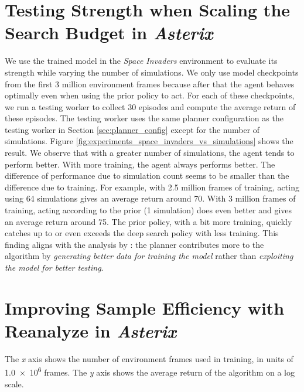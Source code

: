 \section{Testing Strength when Scaling the Search Budget in \textit{Asterix}}
We use the trained \moozi model in the \textit{Space Invaders} environment to evaluate its strength while varying the number of simulations.
We only use model checkpoints from the first 3 million environment frames because after that the agent behaves optimally even when using the prior policy to act.
For each of these checkpoints, we run a testing worker to collect 30 episodes and compute the average return of these episodes.
The testing worker uses the same planner configuration as the testing worker in Section \ref{sec:planner_config} except for the number of simulations.
Figure \ref{fig:experiments_space_invaders_vs_simulations} shows the result.
We observe that with a greater number of simulations, the agent tends to perform better.
With more training, the agent always performs better.
The difference of performance due to simulation count seems to be smaller than the difference due to training.
For example, with 2.5 million frames of training, acting using 64 simulations gives an average return around 70.
With 3 million frames of training, acting according to the prior (1 simulation) does even better and gives an average return around 75.
The prior policy, with a bit more training, quickly catches up to or even exceeds the deep search policy with less training.
This finding aligns with the analysis by \citeauthor{RolePlanningModelbased_Hamrick.Friesen.ea_2022} \cite{RolePlanningModelbased_Hamrick.Friesen.ea_2022}:
the planner contributes more to the algorithm by \textit{generating better data for training the model} rather than \textit{exploiting the model for better testing}.


\section{Improving Sample Efficiency with Reanalyze in \textit{Asterix}} \label{sec:exp:re}

{
    The \textit{x} axis shows the number of environment frames used in training, in units of \num{1.0e6} frames.
    The \textit{y} axis shows the average return of the algorithm on a log scale.
}

